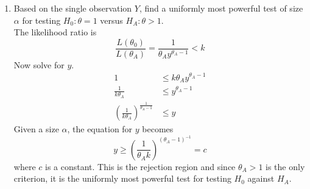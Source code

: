 \documentclass[12pt]{article}
\begin{document}
\begin{enumerate}
\item Based on the single observation $Y$, find a uniformly most powerful test of size $\alpha$ for testing $H_0: \theta = 1$ versus $H_A:\theta > 1$. \\
The likelihood ratio is $$ \frac{L(\theta_0)}{L(\theta_A)} = \frac{1}{\theta_A y^{\theta_A - 1}} < k $$ Now solve for $y$.
$$ \begin{aligned} 1 &\leq k\theta_A y^{\theta_A - 1} \\ \frac{1}{k\theta_A} &\leq y^{\theta_A - 1} \\ \left( \frac{1}{k\theta_A} \right)^{\frac{1}{\theta_A - 1}} &\leq y \end{aligned} $$ 
Given a size $\alpha$, the equation for $y$ becomes $$ y \geq \left( \frac{1}{\theta_A k}\right)^{(\theta_A - 1)^{-1}} = c $$ where $c$ is a constant. This is the rejection region and since $\theta_A > 1$ is the only criterion, it is the uniformly most powerful test for testing $H_0$ against $H_A$. 
\end{enumerate} 
\end{document}
